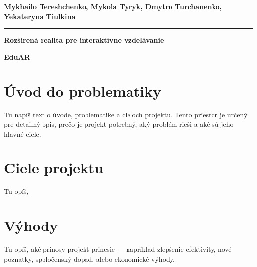 \documentclass[a4paper,12pt]{article}
\begin{document}
\begin{center}
    \textbf{Mykhailo Tereshchenko, Mykola Tyryk, Dmytro Turchanenko, Yekateryna Tiulkina}
\end{center}

\noindent\rule{\textwidth}{0.4pt} %

\vspace{0.5em}

\begin{center}
    \LARGE \textbf{Rozšírená realita pre interaktívne vzdelávanie}
\end{center}


\begin{center}
    \large \textbf{EduAR}
\end{center}

\vspace{1em}

\section{Úvod do problematiky}

Tu napíš text o úvode, problematike a cieľoch projektu.  
Tento priestor je určený pre detailný opis, prečo je projekt potrebný,  
aký problém rieši a aké sú jeho hlavné ciele.

\vspace{1em}
\section{Ciele projektu}

Tu opíš,

\vspace{1em}
\section{Výhody}

Tu opíš, aké prínosy projekt prinesie — napríklad zlepšenie efektivity,  
nové poznatky, spoločenský dopad, alebo ekonomické výhody.
\end{document}
